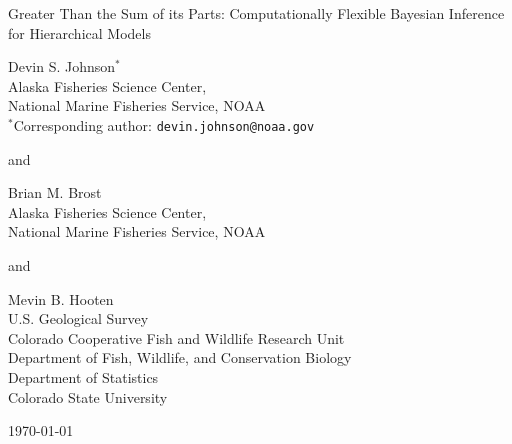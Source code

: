 \documentclass[12pt]{article}
\begin{document}

\vspace*{\fill}

\begin{center}
\setlength{\parindent}{0pt}
\renewcommand{\baselinestretch}{1.8}\normalsize

{\Large Greater Than the Sum of its Parts: Computationally Flexible Bayesian Inference for Hierarchical Models}

\renewcommand{\baselinestretch}{1.15}\normalsize 
\bigskip\bigskip

Devin S. Johnson$^{*}$\\ 
Alaska Fisheries Science Center,\\
National Marine Fisheries Service, NOAA \\
$^*$Corresponding author: {\tt devin.johnson@noaa.gov} \medskip

and\medskip

Brian M. Brost\\
Alaska Fisheries Science Center,\\
National Marine Fisheries Service, NOAA \medskip

and\medskip

Mevin B. Hooten \\
U.S. Geological Survey\\
Colorado Cooperative Fish and Wildlife Research Unit\\
Department of Fish, Wildlife, and Conservation Biology\\
Department of Statistics\\
Colorado State University

\bigskip\bigskip

\today

\end{center}

\vspace*{\fill}

\clearpage


\end{document}
